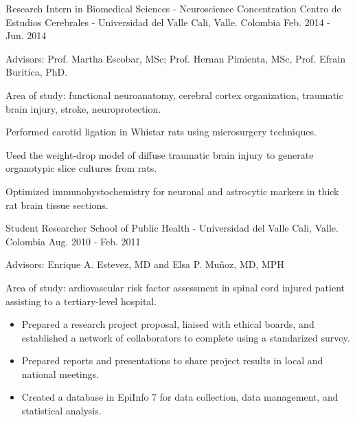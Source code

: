\begin{cventries}
{\begin{cvitems}
\begin{itemize}
\begin{itemize}
            \end{itemize}
        \end{itemize}
      \end{cvitems}
      }
  \cventry
    {Research Intern in Biomedical Sciences - Neuroscience Concentration} %
    {Centro de Estudios Cerebrales - Universidad del Valle} %
    {Cali, Valle. Colombia} %
    {Feb. 2014 - Jun. 2014} %
    {
      \begin{cvitems} %
        \item {Advisors: Prof. Martha Escobar, MSc; Prof. Hernan Pimienta, MSc, Prof. Efrain Buritica, PhD.}
        \item {Area of study: functional neuroanatomy, cerebral cortex organization, traumatic brain injury, stroke, neuroprotection.}
        \item {Performed carotid ligation in Whistar rats using microsurgery techniques.}
        \item {Used the weight-drop model of diffuse traumatic brain injury to generate organotypic slice cultures from rats.}
        \item {Optimized immunohystochemistry for neuronal and astrocytic markers in thick rat brain tissue sections.}
      \end{cvitems}
    }
\vspace{10pt}
  \cventry
  {Student Researcher} %
  {School of Public Health - Universidad del Valle} %
  {Cali, Valle. Colombia} %
  {Aug. 2010 - Feb. 2011} %
  {
  \begin{cvitems} %
    \item {Advisors: Enrique A. Estevez, MD and Elsa P. Muñoz, MD, MPH}
    \item {Area of study: ardiovascular risk factor assessment in spinal cord injured patient assisting to a tertiary-level
    hospital.}
    \begin{itemize}
      \item {Prepared a research project proposal, liaised with ethical boards, and established a network of collaborators to complete using a standarized survey.}
      \item {Prepared reports and presentations to share project results in local and national meetings.}
      \item {Created a database in EpiInfo 7 for data collection, data management, and statistical analysis.}

\end{itemize}
\end{cvitems}}
\end{cventries}
